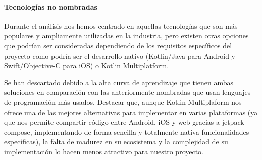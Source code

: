 \paragraph{Tecnologías no nombradas}
Durante el análisis nos hemos centrado en aquellas tecnologías que son más populares y ampliamente utilizadas en la industria, pero existen otras opciones que podrían ser consideradas dependiendo de los requisitos específicos del proyecto como podría ser el desarrollo nativo (Kotlin/Java para Android y Swift/Objective-C para iOS) o Kotlin Multiplatform.

Se han descartado debido a la alta curva de aprendizaje que tienen ambas soluciones en comparación con las anteriormente nombradas que usan lenguajes de programación más usados. Destacar que, aunque Kotlin Multiplaform nos ofrece una de las mejores alternativas para implementar en varias plataformas (ya que nos permite compartir código entre Android, iOS y web gracias a \gls{jetpack-compose}, implementando de forma sencilla y totalmente nativa funcionalidades específicas), la falta de madurez en su ecosistema y la complejidad de su implementación lo hacen menos atractivo para nuestro proyecto.
